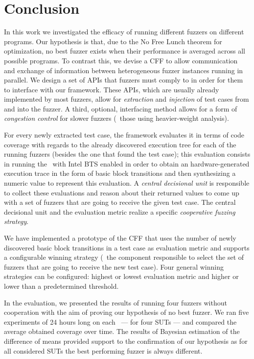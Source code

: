 \chapter{Conclusion}
\label{chap:conclusion}

In this work we investigated the efficacy of running different fuzzers on
different programs. Our hypothesis is that, due to the No Free Lunch theorem for
optimization, no best fuzzer exists when their performance is averaged across
all possible programs. To contrast this, we devise a \acf{CFF} to allow
communication and exchange of information between heterogeneous fuzzer instances
running in parallel. We design a set of \acp{API} that fuzzers must comply to in
order for them to interface with our framework. These \acp{API}, which are
usually already implemented by most fuzzers, allow for \emph{extraction} and
\emph{injection} of test cases from and into the fuzzer. A third, optional,
interfacing method allows for a form of \emph{congestion control} for slower
fuzzers (\eg~those using heavier-weight analysis).

For every newly extracted test case, the framework evaluates it in terms of code
coverage with regards to the already discovered execution tree for each of the
running fuzzers (besides the one that found the test case); this evaluation
consists in running the \sut\ with Intel \ac{BTS} enabled in order to obtain an
hardware-generated execution trace in the form of basic block transitions and
then synthesizing a numeric value to represent this evaluation. A \emph{central
decisional unit} is responsible to collect these evaluations and reason about
their returned values to come up with a set of fuzzers that are going to receive
the given test case. The central decisional unit and the evaluation metric
realize a specific \emph{cooperative fuzzing strategy}.

We have implemented a prototype of the \ac{CFF} that uses the number of newly
discovered basic block transitions in a test case as evaluation metric and
supports a configurable winning strategy (\ie~the component responsible to
select the set of fuzzers that are going to receive the new test case). Four
general winning strategies can be configured: highest or lowest evaluation
metric and higher or lower than a predetermined threshold.

In the evaluation, we presented the results of running four fuzzers without
cooperation with the aim of proving our hypothesis of no best fuzzer. We ran
five experiments of 24 hours long on each \sut\ --- for four \acp{SUT} --- and
compared the average obtained coverage over time. The results of Bayesian
estimation of the difference of means provided support to the confirmation of
our hypothesis as for all considered \acp{SUT} the best performing fuzzer is
always different.

